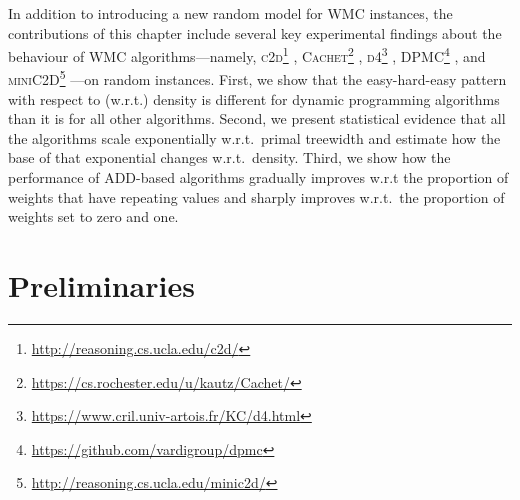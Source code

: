 In addition to introducing a new random model for \textsf{WMC} instances, the
contributions of this chapter include several key experimental findings about
the behaviour of \textsf{WMC} algorithms---namely,
\textsc{c2d}\footnote{\url{http://reasoning.cs.ucla.edu/c2d/}}
\citep{DBLP:conf/ecai/Darwiche04},
\textsc{Cachet}\footnote{\url{https://cs.rochester.edu/u/kautz/Cachet/}}
\citep{DBLP:conf/sat/SangBBKP04},
\textsc{d4}\footnote{\url{https://www.cril.univ-artois.fr/KC/d4.html}}
\citep{DBLP:conf/ijcai/LagniezM17},
\textsc{DPMC}\footnote{\url{https://github.com/vardigroup/dpmc}}
\citep{DBLP:conf/cp/DudekPV20}, and
\textsc{miniC2D}\footnote{\url{http://reasoning.cs.ucla.edu/minic2d/}}
\citep{DBLP:conf/ijcai/OztokD15}---on random instances. First, we show that the
easy-hard-easy pattern with respect to (w.r.t.) density is different for dynamic
programming algorithms than it is for all other algorithms. Second, we present
statistical evidence that all the algorithms scale exponentially w.r.t.\ primal
treewidth and estimate how the base of that exponential changes w.r.t.\ density.
Third, we show how the performance of ADD-based algorithms gradually improves
w.r.t the proportion of weights that have repeating values and sharply improves
w.r.t.\ the proportion of weights set to zero and one.


\section{Preliminaries}


